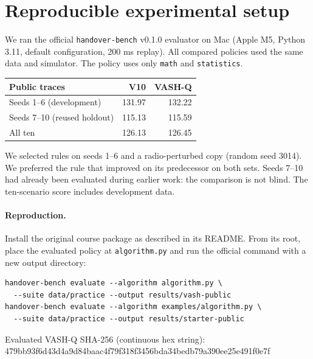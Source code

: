 \documentclass[11pt,a4paper]{article}
\begin{document}
\section{Reproducible experimental setup}
We ran the official \texttt{handover-bench} v0.1.0 evaluator on Mac (Apple M5, Python 3.11, default configuration, 200 ms replay). All compared policies used the same data and simulator. The policy uses only \texttt{math} and \texttt{statistics}.
\begin{center}\begin{tabular}{lrr}\toprule
Public traces & V10 & VASH-Q\\\midrule
Seeds 1--6 (development)&131.97&132.22\\
Seeds 7--10 (reused holdout)&115.13&115.59\\
All ten&126.13&126.45\\\bottomrule
\end{tabular}\end{center}
We selected rules on seeds 1--6 and a radio-perturbed copy (random seed 3014). We preferred the rule that improved on its predecessor on both sets. Seeds 7--10 had already been evaluated during earlier work: the comparison is not blind. The ten-scenario score includes development data.
\paragraph{Reproduction.} Install the original course package as described in its README. From its root, place the evaluated policy at \texttt{algorithm.py} and run the official command with a new output directory:
\begin{verbatim}
handover-bench evaluate --algorithm algorithm.py \
  --suite data/practice --output results/vash-public
handover-bench evaluate --algorithm examples/algorithm.py \
  --suite data/practice --output results/starter-public
\end{verbatim}
Evaluated VASH-Q SHA-256 (continuous hex string):\\
{\small\ttfamily 479bb93f6d43d4a9d84baac4f79f318f3456bda34bedb79a390ee25e491f0e7f}
\newpage
\end{document}
